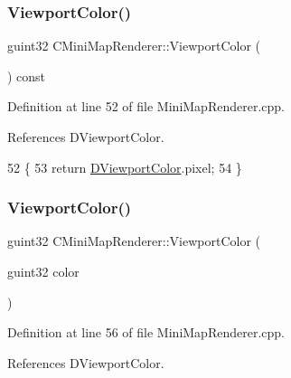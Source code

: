 \hypertarget{classCMiniMapRenderer_a465a10988fd1b47ee1ef223055e1ae65}{}\label{classCMiniMapRenderer_a465a10988fd1b47ee1ef223055e1ae65} 
\subsubsection{\texorpdfstring{Viewport\+Color()}{ViewportColor()}\hspace{0.1cm}{\footnotesize\ttfamily [1/2]}}
{\footnotesize\ttfamily guint32 C\+Mini\+Map\+Renderer\+::\+Viewport\+Color (\begin{DoxyParamCaption}{ }\end{DoxyParamCaption}) const}



Definition at line 52 of file Mini\+Map\+Renderer.\+cpp.



References D\+Viewport\+Color.


\begin{DoxyCode}
52                                              \{
53     \textcolor{keywordflow}{return} \hyperlink{classCMiniMapRenderer_a6a4f56052a4ced356448f5f1cc9a465e}{DViewportColor}.pixel;
54 \}
\end{DoxyCode}
\hypertarget{classCMiniMapRenderer_a89bf3db7ca4273dfcadff53da12824fc}{}\label{classCMiniMapRenderer_a89bf3db7ca4273dfcadff53da12824fc} 
\subsubsection{\texorpdfstring{Viewport\+Color()}{ViewportColor()}\hspace{0.1cm}{\footnotesize\ttfamily [2/2]}}
{\footnotesize\ttfamily guint32 C\+Mini\+Map\+Renderer\+::\+Viewport\+Color (\begin{DoxyParamCaption}\item[{guint32}]{color }\end{DoxyParamCaption})}



Definition at line 56 of file Mini\+Map\+Renderer.\+cpp.



References D\+Viewport\+Color.


